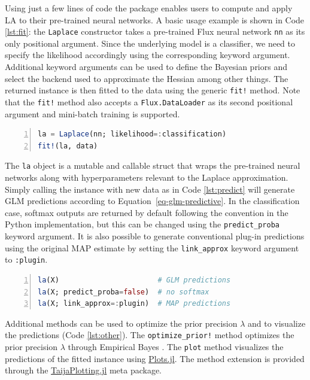 \documentclass{juliacon}
\begin{document}
Using just a few lines of code the package enables users to compute and
apply LA to their pre-trained neural networks. A basic usage example is
shown in Code \ref{lst:fit}: the \texttt{Laplace} constructor takes a
pre-trained Flux neural network \texttt{nn} as its only positional
argument. Since the underlying model is a classifier, we need to specify
the likelihood accordingly using the corresponding keyword argument.
Additional keyword arguments can be used to define the Bayesian priors
and select the backend used to approximate the Hessian among other
things. The returned instance is then fitted to the data using the
generic \texttt{fit!} method. Note that the \texttt{fit!} method also
accepts a \texttt{Flux.DataLoader} as its second positional argument and
mini-batch training is supported.

\begin{lstlisting}[language=Julia, escapechar=@, numbers=left, label={lst:fit}, caption={Fitting a pre-trained neural network to data using Laplace Redux.}]
la = Laplace(nn; likelihood=:classification)
fit!(la, data)
\end{lstlisting}

The \texttt{la} object is a mutable and callable struct that wraps the
pre-trained neural networks along with hyperparameters relevant to the
Laplace approximation. Simply calling the instance with new data as in
Code \ref{lst:predict} will generate GLM predictions according to
Equation~\ref{eq-glm-predictive}. In the classification case, softmax
outputs are returned by default following the convention in the Python
implementation, but this can be changed using the
\texttt{predict\_proba} keyword argument. It is also possible to
generate conventional plug-in predictions using the original MAP
estimate by setting the \texttt{link\_approx} keyword argument to
\texttt{:plugin}.

\begin{lstlisting}[language=Julia, escapechar=@, numbers=left, label={lst:predict}, caption={Predictions using the fitted Laplace Redux instance.}]
la(X)                       # GLM predictions
la(X; predict_proba=false)  # no softmax
la(X; link_approx=:plugin)  # MAP predictions
\end{lstlisting}

Additional methods can be used to optimize the prior precision
\(\lambda\) and to visualize the predictions (Code \ref{lst:other}). The
\texttt{optimize\_prior!} method optimizes the prior precision
\(\lambda\) through Empirical Bayes \cite{daxberger2021laplace}. The
\texttt{plot} method visualizes the predictions of the fitted instance
using \href{https://docs.juliaplots.org/stable/}{Plots.jl}. The method
extension is provided through the
\href{https://github.com/JuliaTrustworthyAI/TaijaPlotting.jl}{TaijaPlotting.jl}
meta package.
\end{document}
